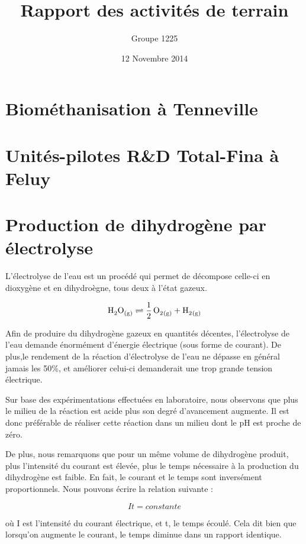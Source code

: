 \documentclass[a4paper, oneside, 12pt]{article}
\title{Rapport des activités de terrain}
\author{Groupe 1225}
\date{12 Novembre 2014}
\begin{document}
\maketitle

\section{Biométhanisation à Tenneville}

\section{Unités-pilotes R\&D Total-Fina à Feluy}

\section{Production de dihydrogène par électrolyse}

L'électrolyse de l'eau est un procédé qui permet de décompose celle-ci en dioxygène et en dihydroègne, tous deux à l'état gazeux.

\begin{equation*}
	\ce{H2O_{(g)} \rightleftharpoons  \frac{1}{2} \, O2_{(g)} + H2_{(g)}} 
\end{equation*}

Afin de produire du dihydrogène gazeux en quantités décentes, l'électrolyse de l'eau demande énormément d'énergie électrique (sous forme de courant). De plus,le rendement de la réaction d'électrolyse de l'eau ne dépasse en général jamais les 50\%, et améliorer celui-ci demanderait une trop grande tension électrique.

Sur base des expérimentations effectuées en laboratoire, nous observons que plus le milieu de la réaction est acide plus son degré d'avancement augmente. Il est donc préférable de réaliser cette réaction dans un milieu dont le pH est proche de zéro.

De plus, nous remarquons que pour un même volume de dihydrogène produit, plus l'intensité du courant est élevée, plus le temps nécessaire à la production du dihydrogène est faible. En fait, le courant et le temps sont inversément proportionnels. Nous pouvons écrire la relation suivante : 

\begin{equation*}
	It = constante
\end{equation*}

où I est l'intensité du courant électrique, et t, le temps écoulé. Cela dit bien que lorsqu'on augmente le courant, le temps diminue dans un rapport identique.
\end{document}
